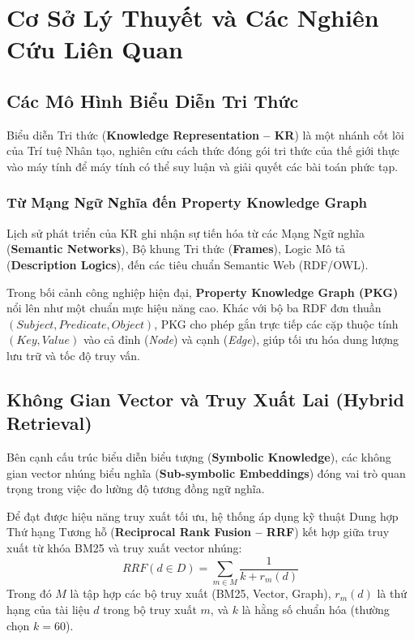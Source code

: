 \documentclass[11pt,a4paper]{report}
\begin{document}
\chapter{Cơ Sở Lý Thuyết và Các Nghiên Cứu Liên Quan}

\section{Các Mô Hình Biểu Diễn Tri Thức}
Biểu diễn Tri thức (\textbf{Knowledge Representation -- KR}) là một nhánh cốt lõi của Trí tuệ Nhân tạo, nghiên cứu cách thức đóng gói tri thức của thế giới thực vào máy tính để máy tính có thể suy luận và giải quyết các bài toán phức tạp.

\subsection{Từ Mạng Ngữ Nghĩa đến Property Knowledge Graph}
Lịch sử phát triển của KR ghi nhận sự tiến hóa từ các Mạng Ngữ nghĩa (\textbf{Semantic Networks}), Bộ khung Tri thức (\textbf{Frames}), Logic Mô tả (\textbf{Description Logics}), đến các tiêu chuẩn Semantic Web (RDF/OWL).

Trong bối cảnh công nghiệp hiện đại, \textbf{Property Knowledge Graph (PKG)} nổi lên như một chuẩn mực hiệu năng cao. Khác với bộ ba RDF đơn thuần $(Subject, Predicate, Object)$, PKG cho phép gắn trực tiếp các cặp thuộc tính $(Key, Value)$ vào cả đỉnh (\textit{Node}) và cạnh (\textit{Edge}), giúp tối ưu hóa dung lượng lưu trữ và tốc độ truy vấn.

\section{Không Gian Vector và Truy Xuất Lai (Hybrid Retrieval)}
Bên cạnh cấu trúc biểu diễn biểu tượng (\textbf{Symbolic Knowledge}), các không gian vector nhúng biểu nghĩa (\textbf{Sub-symbolic Embeddings}) đóng vai trò quan trọng trong việc đo lường độ tương đồng ngữ nghĩa.

Để đạt được hiệu năng truy xuất tối ưu, hệ thống áp dụng kỹ thuật Dung hợp Thứ hạng Tương hỗ (\textbf{Reciprocal Rank Fusion -- RRF}) kết hợp giữa truy xuất từ khóa BM25 và truy xuất vector nhúng:
\begin{equation}
RRF(d \in D) = \sum_{m \in M} \frac{1}{k + r_m(d)}
\end{equation}
Trong đó $M$ là tập hợp các bộ truy xuất (BM25, Vector, Graph), $r_m(d)$ là thứ hạng của tài liệu $d$ trong bộ truy xuất $m$, và $k$ là hằng số chuẩn hóa (thường chọn $k = 60$).
\end{document}
